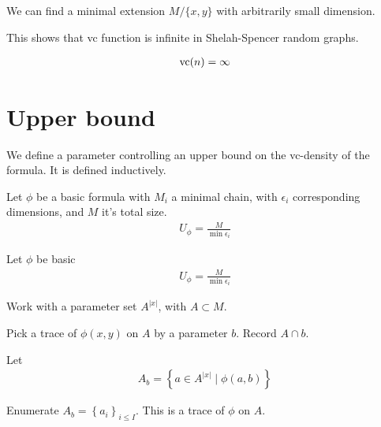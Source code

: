 \documentclass{amsart}
\newcommand{\curly}[1]{\left\{#1\right\}}
\begin{document}
\begin{Claim}
	We can find a minimal extension $M / \{x, y\}$ with arbitrarily small dimension.
\end{Claim}

This shows that vc function is infinite in Shelah-Spencer random graphs.

\begin{align*}
	\operatorname{vc}(n) = \infty
\end{align*}

\section{Upper bound}

We define a parameter controlling an upper bound on the vc-density of the formula.
It is defined inductively.

\begin{Definition}
	Let $\phi$ be a basic formula with $M_i$ a minimal chain,
	with $\epsilon_i$ corresponding dimensions,
	and $M$ it's total size.
	\begin{align*}
		U_\phi = \frac{M}{\min \epsilon_i}
	\end{align*}
\end{Definition}

\begin{Definition} [Negation]
	Let $\phi$ be basic
	\begin{align*}
		U_\phi = \frac{M}{\min \epsilon_i}
	\end{align*}
\end{Definition}



Work with a parameter set $A^{|x|}$, with $A \subset M$.


Pick a trace of $\phi(x,y)$ on $A$ by a parameter $b$.
Record $A \cap b$.

Let
\begin{align*}
	A_b = \curly{a \in A^{|x|} \mid \phi(a, b)}
\end{align*}

Enumerate $A_b = \curly{a_i}_{i \leq I}$.
This is a trace of $\phi$ on $A$.
\end{document}
